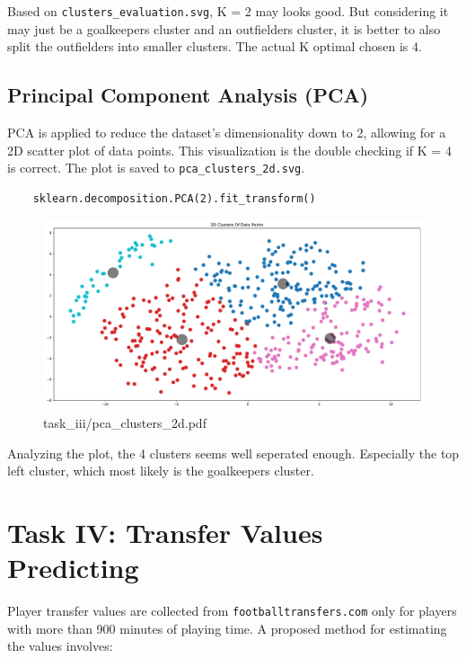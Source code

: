 \documentclass{report}
\begin{document}
\noindent
Based on \verb|clusters_evaluation.svg|, K = 2 may looks good. But considering it may just be a 
goalkeepers cluster and an outfielders cluster, it is better to also split the outfielders into smaller
clusters. The actual K optimal chosen is 4.

\subsection{Principal Component Analysis (PCA)}
PCA is applied to reduce the dataset's dimensionality down to 2, allowing for a 2D scatter plot of data 
points. This visualization is the double checking if K = 4 is correct. The plot is saved to 
\verb|pca_clusters_2d.svg|.
\begin{verbatim}
    sklearn.decomposition.PCA(2).fit_transform()
\end{verbatim}
\begin{figure}[ht!]
    \centering
    \includegraphics[width=\textwidth]{../output/task_iii/pca_clusters_2d.pdf}
    \caption{task\_iii/pca\_clusters\_2d.pdf}
\end{figure}
Analyzing the plot, the 4 clusters seems well seperated enough. Especially the top left cluster, which
most likely is the goalkeepers cluster.

\section{Task IV: Transfer Values Predicting}
Player transfer values are collected from \verb|footballtransfers.com| only for players with more than 
900 minutes of playing time. A proposed method for estimating the values involves:
\end{document}
